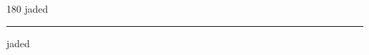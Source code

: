 
\begin{frame}
\begin{center}
\begin{turn}{180}
{\fontsize{2.5cm}{1em}\selectfont jaded}
\end{turn}
\vspace{1em}\par  
\hrule
\vspace{1em}\par  
{\fontsize{2.5cm}{1em}\selectfont jaded}
\end{center}
\end{frame}
